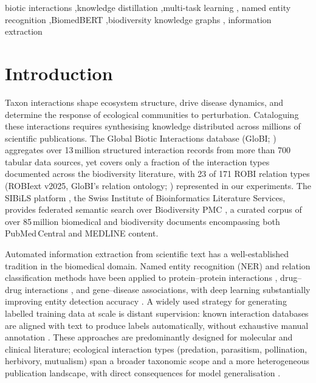 \documentclass[a4paper,fleqn]{cas-sc}
\begin{document}
\begin{keywords}
biotic interactions \sep knowledge distillation \sep multi-task learning \sep
named entity recognition \sep BiomedBERT \sep biodiversity knowledge graphs \sep
information extraction
\end{keywords}

\maketitle

\section{Introduction}
\label{sec:intro}

Taxon interactions shape ecosystem structure, drive disease dynamics,
and determine the response of ecological communities to perturbation.
Cataloguing these interactions requires synthesising knowledge distributed
across millions of scientific publications.
The Global Biotic Interactions database (GloBI; \citep{poelen2014global})
aggregates over 13\,million structured interaction records from more than 700 tabular
data sources, yet covers only a fraction of the interaction types documented
across the biodiversity literature, with 23 of 171 ROBI relation types
(ROBIext v2025, GloBI's relation ontology; \citep{poelen2014global})
represented in our experiments.
The SIBiLS platform \citep{mottin2021sibils}, the Swiss Institute of
Bioinformatics Literature Services, provides federated semantic search over
Biodiversity PMC \citep{biodiversitypmc2024}, a curated corpus of over
85\,million biomedical and biodiversity documents encompassing both
PubMed\,Central and MEDLINE content.

Automated information extraction from scientific text has a well-established
tradition in the biomedical domain.
Named entity recognition (NER) and relation classification methods have been
applied to protein--protein interactions \citep{bunescu2005comparative},
drug--drug interactions \citep{lim2018drug}, and gene--disease associations,
with deep learning substantially improving entity detection accuracy
\citep{habibi2017deep}.
A widely used strategy for generating labelled training data at scale is
distant supervision: known interaction databases are aligned with text to
produce labels automatically, without exhaustive manual annotation
\citep{mintz2009distant}.
These approaches are predominantly designed for molecular and clinical
literature; ecological interaction types (predation, parasitism, pollination,
herbivory, mutualism) span a broader taxonomic scope and a more heterogeneous
publication landscape, with direct consequences for model generalisation
\citep{thessen2012nlp}.
\end{document}
